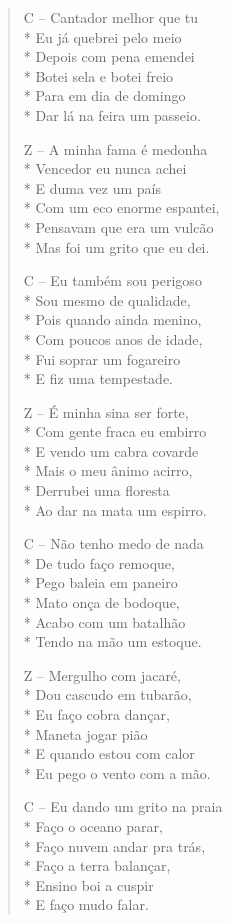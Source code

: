 \begin{verse}
C – Cantador melhor que tu\\*
Eu já quebrei pelo meio\\*
Depois com pena emendei\\*
Botei sela e botei freio\\*
Para em dia de domingo\\*
Dar lá na feira um passeio.

Z – A minha fama é medonha\\*
Vencedor eu nunca achei\\*
E duma vez um país\\*
Com um eco enorme espantei,\\*
Pensavam que era um vulcão\\*
Mas foi um grito que eu dei.

C – Eu também sou perigoso\\*
Sou mesmo de qualidade,\\*
Pois quando ainda menino,\\*
Com poucos anos de idade,\\*
Fui soprar um fogareiro\\*
E fiz uma tempestade.

Z – É minha sina ser forte,\\*
Com gente fraca eu embirro\\*
E vendo um cabra covarde\\*
Mais o meu ânimo acirro,\\*
Derrubei uma floresta\\*
Ao dar na mata um espirro.

C – Não tenho medo de nada\\*
De tudo faço remoque,\\*
Pego baleia em paneiro\\*
Mato onça de bodoque,\\*
Acabo com um batalhão\\*
Tendo na mão um estoque.

Z – Mergulho com jacaré,\\*
Dou cascudo em tubarão,\\*
Eu faço cobra dançar,\\*
Maneta jogar pião\\*
E quando estou com calor\\*
Eu pego o vento com a mão.

C – Eu dando um grito na praia\\*
Faço o oceano parar,\\*
Faço nuvem andar pra trás,\\*
Faço a terra balançar,\\*
Ensino boi a cuspir\\*
E faço mudo falar.


\end{verse}
